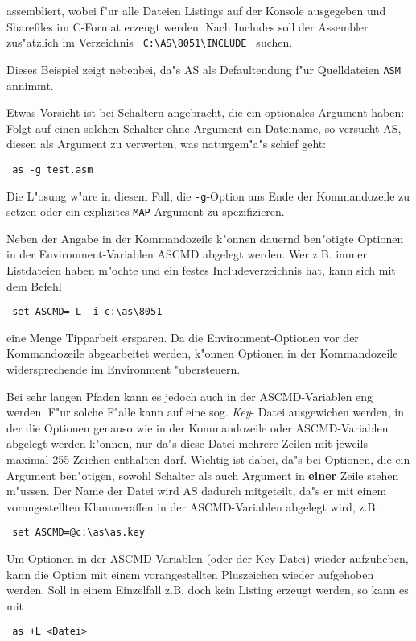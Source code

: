 \documentclass[12pt,a4paper,twoside]{report}
\newcommand{\ii}[1]{{\it #1}}
\newcommand{\bb}[1]{{\bf #1}}
\newcommand{\tty}[1]{{\tt #1}}
\begin{document}
assembliert, wobei f"ur alle Dateien Listings auf der Konsole
ausgegeben und Sharefiles im C-Format erzeugt werden.  Nach Includes
soll der Assembler zus"atzlich im Verzeichnis \verb! C:\AS\8051\INCLUDE !
suchen.
\par
Dieses Beispiel zeigt nebenbei, da"s AS als Defaultendung f"ur Quelldateien
\tty{ASM} annimmt.
\par
Etwas Vorsicht ist bei Schaltern angebracht, die ein optionales Argument
haben: Folgt auf einen solchen Schalter ohne Argument ein Dateiname, so
versucht AS, diesen als Argument zu verwerten, was naturgem"a"s schief
geht: 
\begin{verbatim}
 as -g test.asm
\end{verbatim}
Die L"osung w"are in diesem Fall, die \tty{-g}-Option ans Ende der
Kommandozeile zu setzen oder ein explizites \tty{MAP}-Argument zu
spezifizieren.
\par
Neben der Angabe in der Kommandozeile k"onnen dauernd ben"otigte
Optionen in der Environment-Variablen ASCMD abgelegt werden. Wer z.B.
immer Listdateien haben m"ochte und ein festes Includeverzeichnis hat,
kann sich mit dem Befehl
\begin{verbatim}
 set ASCMD=-L -i c:\as\8051
\end{verbatim}
eine Menge Tipparbeit ersparen.  Da die Environment-Optionen vor der
Kommandozeile abgearbeitet werden, k"onnen Optionen in der
Kommandozeile widersprechende im Environment "ubersteuern.
\par
Bei sehr langen Pfaden kann es jedoch auch in der ASCMD-Variablen eng
werden.  F"ur solche F"alle kann auf eine sog. \ii{Key}- Datei
ausgewichen werden, in der die Optionen genauso wie in der Kommandozeile
oder ASCMD-Variablen abgelegt werden k"onnen, nur da"s diese Datei
mehrere Zeilen mit jeweils maximal 255 Zeichen enthalten darf.  Wichtig
ist dabei, da"s bei Optionen, die ein Argument ben"otigen, sowohl Schalter
als auch Argument in \bb{einer} Zeile stehen m"ussen.  Der Name der
Datei wird AS dadurch mitgeteilt, da"s er mit einem vorangestellten
Klammeraffen in der ASCMD-Variablen abgelegt wird, z.B.
\begin{verbatim}
 set ASCMD=@c:\as\as.key
\end{verbatim}
Um Optionen in der ASCMD-Variablen (oder der Key-Datei) wieder aufzuheben,
kann die Option mit einem vorangestellten Pluszeichen wieder aufgehoben
werden.  Soll in einem Einzelfall z.B. doch kein Listing erzeugt werden,
so kann es mit
\begin{verbatim}
 as +L <Datei>
\end{verbatim}
\end{document}
